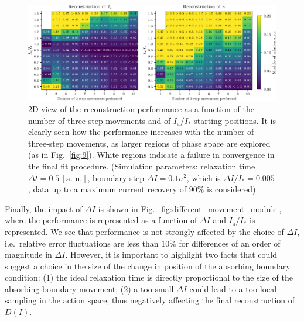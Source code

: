 \begin{figure}[htp]
    \centering
    \includegraphics[width=\textwidth]{4_probing_the_diffusive_behavior/figs/final/MULTI_different_samples.pdf}
    \caption{2D view of the reconstruction performance as a function of the number of three-step movements and of $I_\mathrm{a}/I_\ast$ starting positions. It is clearly seen how the performance increases with the number of three-step movements, as larger regions of phase space are explored (as in Fig.~\ref{fig:9}). White regions indicate a failure in convergence in the final fit procedure. (Simulation parameters: relaxation time $\Delta t=0.5 \, [\text{a. u.}]$, boundary step $\Delta I=0.1 \sigma^2$, which is $\Delta I / I_\ast = 0.005$, data up to a maximum current recovery of $90\%$ is considered).}
    \label{fig:different_nsamples}
\end{figure}

Finally, the impact of $\Delta I$ is shown in Fig.~\ref{fig:different_movement_module}, where the performance is represented as a function of $\Delta I$ and $I_\mathrm{a}/I_\ast$ is represented.  We see that performance is not strongly affected by the choice of $\Delta I$, i.e.\ relative error fluctuations are less than $10\%$ for differences of an order of magnitude in $\Delta I$. However, it is important to highlight two facts that could suggest a choice in the size of the change in position of the absorbing boundary condition: (1) the ideal relaxation time is directly proportional to the size of the absorbing boundary movement; (2) a too small $\Delta I$ could lead to a too local sampling in the action space, thus negatively affecting the final reconstruction of $D(I)$. 

